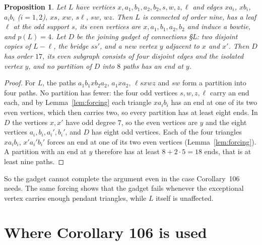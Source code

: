\documentclass[11pt]{amsart}
\newtheorem{proposition}[theorem]{Proposition}
\theoremstyle{definition}
\begin{document}
\begin{proposition}\label{prop:gadget}
Let $L$ have vertices $x,a_1,b_1,a_2,b_2,s,w,z,\ell$ and edges $xa_i$, $xb_i$, $a_ib_i$ ($i=1,2$),
$xs$, $xw$, $s\ell$, $sw$, $wz$. Then $L$ is connected of order nine, has a leaf $\ell$ at the odd
support $s$, its even vertices are $x,a_1,b_1,a_2,b_2$ and induce a bowtie, and $p(L)=4$. Let $D$
be the joining gadget of connections \S L: two disjoint copies of $L-\ell$, the bridge $ss'$, and a
new vertex $y$ adjacent to $x$ and $x'$. Then $D$ has order $17$, its even subgraph consists of four
disjoint edges and the isolated vertex $y$, and no partition of $D$ into $8$ paths has an end at $y$.
\end{proposition}

\begin{proof}
For $L$, the paths $a_1b_1xb_2a_2$, $a_1xa_2$, $\ell sxwz$ and $sw$ form a partition into four paths.
No partition has fewer: the four odd vertices $s,w,z,\ell$ carry an end each, and by
Lemma~\ref{lem:forcing} each triangle $xa_ib_i$ has an end at one of its two even vertices, which
then carries two, so every partition has at least eight ends. In $D$ the vertices $x,x'$ have
odd degree $7$, so the even vertices are $y$ and the eight vertices $a_i,b_i,a_i',b_i'$, and $D$ has
eight odd vertices. Each of the four triangles $xa_ib_i$, $x'a_i'b_i'$ forces an end at one of its
two even vertices (Lemma~\ref{lem:forcing}). A partition with an end at $y$ therefore has at least
$8+2\cdot5=18$ ends, that is at least nine paths.
\end{proof}

So the gadget cannot complete the argument even in the case Corollary~106 needs. The same forcing
shows that the gadget fails whenever the exceptional vertex carries enough pendant triangles, while
$L$ itself is unaffected.

\section{Where Corollary 106 is used}\label{sec:needs}
\end{document}
